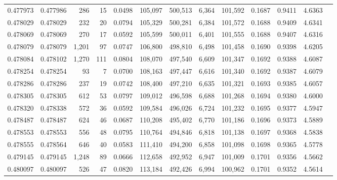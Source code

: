 \begin{tabular}{rrrrrrrrrrrrr}
0.477973 & 0.477986 &   286 &    15 &                                     0.0498 & 105,097 & 500,513 &   6,364 & 101,592 & 0.1687 & 0.9411 & 4.6363 \\
0.478029 & 0.478029 &   232 &    20 &                                     0.0794 & 105,329 & 500,281 &   6,384 & 101,572 & 0.1688 & 0.9409 & 4.6341 \\
0.478069 & 0.478069 &   270 &    17 &                                     0.0592 & 105,599 & 500,011 &   6,401 & 101,555 & 0.1688 & 0.9407 & 4.6316 \\
0.478079 & 0.478079 & 1,201 &    97 &                                     0.0747 & 106,800 & 498,810 &   6,498 & 101,458 & 0.1690 & 0.9398 & 4.6205 \\
0.478084 & 0.478102 & 1,270 &   111 &                                     0.0804 & 108,070 & 497,540 &   6,609 & 101,347 & 0.1692 & 0.9388 & 4.6087 \\
0.478254 & 0.478254 &    93 &     7 &                                     0.0700 & 108,163 & 497,447 &   6,616 & 101,340 & 0.1692 & 0.9387 & 4.6079 \\
0.478286 & 0.478286 &   237 &    19 &                                     0.0742 & 108,400 & 497,210 &   6,635 & 101,321 & 0.1693 & 0.9385 & 4.6057 \\
0.478305 & 0.478305 &   612 &    53 &                                     0.0797 & 109,012 & 496,598 &   6,688 & 101,268 & 0.1694 & 0.9380 & 4.6000 \\
0.478320 & 0.478338 &   572 &    36 &                                     0.0592 & 109,584 & 496,026 &   6,724 & 101,232 & 0.1695 & 0.9377 & 4.5947 \\
0.478487 & 0.478487 &   624 &    46 &                                     0.0687 & 110,208 & 495,402 &   6,770 & 101,186 & 0.1696 & 0.9373 & 4.5889 \\
0.478553 & 0.478553 &   556 &    48 &                                     0.0795 & 110,764 & 494,846 &   6,818 & 101,138 & 0.1697 & 0.9368 & 4.5838 \\
0.478555 & 0.478564 &   646 &    40 &                                     0.0583 & 111,410 & 494,200 &   6,858 & 101,098 & 0.1698 & 0.9365 & 4.5778 \\
0.479145 & 0.479145 & 1,248 &    89 &                                     0.0666 & 112,658 & 492,952 &   6,947 & 101,009 & 0.1701 & 0.9356 & 4.5662 \\
0.480097 & 0.480097 &   526 &    47 &                                     0.0820 & 113,184 & 492,426 &   6,994 & 100,962 & 0.1701 & 0.9352 & 4.5614 \\

\end{tabular}
